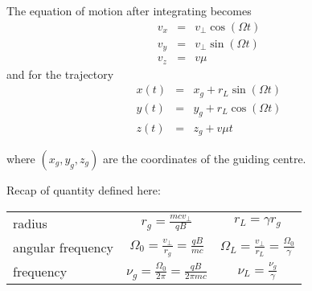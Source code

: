 The equation of motion after integrating becomes
%
\begin{eqnarray}
v_x & = & v_\perp \cos \left(\Omega t\right) \\
v_y & = & v_\perp \sin \left(\Omega t\right) \\
v_z & = & v \mu
\end{eqnarray}
%
and for the trajectory
%
\begin{eqnarray}
x(t) & = & x_g + r_L \sin \left(\Omega t\right) \\
y(t) & = & y_g + r_L \cos \left(\Omega t\right) \\
z(t) & = & z_g + v \mu t
\end{eqnarray}

where $(x_g, y_g, z_g)$ are the coordinates of the guiding centre.

Recap of quantity defined here: 
%
\begin{center}
\begin{tabular}{|l|c|c|}
\toprule
radius & $r_g = \frac{m c v_\perp}{qB}$ & $r_L = \gamma r_g$ \\
angular frequency & $\Omega_0 = \frac{v_\perp}{r_g} = \frac{qB}{m c}$ & $\Omega_L =  \frac{v_\perp}{r_L} = \frac{\Omega_0}{\gamma} $\\
frequency & $\nu_g = \frac{\Omega_0}{2\pi} = \frac{qB}{2 \pi m c}$ & $\nu_L =  \frac{\nu_g}{\gamma} $\\
\bottomrule
\end{tabular}
\end{center}

